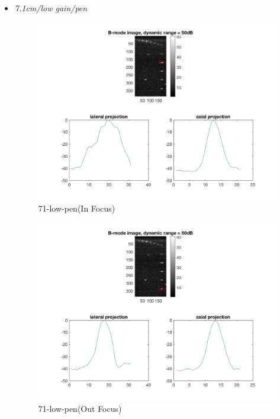\documentclass[12pts,a4paper]{article}
\begin{document}
\begin{itemize}
\item{\emph{7.1cm/low gain/pen}}
\begin{center}
\end{center}
\begin{figure}[h]
    \centering
    \includegraphics[width=1.0\textwidth]{img_hw1/71-low-pen1.jpg}
    \caption{71-low-pen(In Focus)}
    \label{fig:mesh1}
\end{figure}
\pagebreak
\begin{figure}[h]
    \centering
    \includegraphics[width=1.0\textwidth]{img_hw1/71-low-pen2.jpg}
    \caption{71-low-pen(Out Focus)}
    \label{fig:mesh1}
\end{figure}
\pagebreak

\end{itemize}
\end{document}
